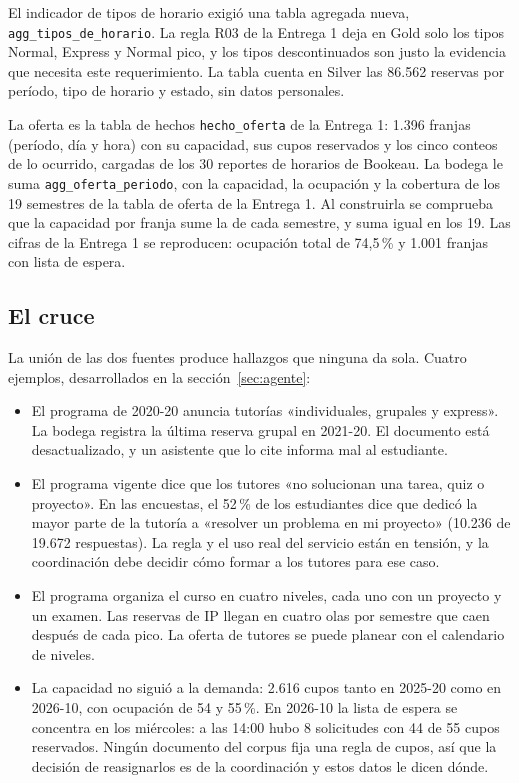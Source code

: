 \documentclass[11pt,letterpaper]{article}
\newcommand{\cod}[1]{\texttt{\small #1}}
\begin{document}
El indicador de tipos de horario exigió una tabla agregada nueva, \cod{agg\_tipos\_de\_horario}. La regla R03 de la Entrega 1 deja en Gold solo los tipos Normal, Express y Normal pico, y los tipos descontinuados son justo la evidencia que necesita este requerimiento. La tabla cuenta en Silver las 86.562 reservas por período, tipo de horario y estado, sin datos personales.

La oferta es la tabla de hechos \cod{hecho\_oferta} de la Entrega 1: 1.396 franjas (período, día y hora) con su capacidad, sus cupos reservados y los cinco conteos de lo ocurrido, cargadas de los 30 reportes de horarios de Bookeau. La bodega le suma \cod{agg\_oferta\_periodo}, con la capacidad, la ocupación y la cobertura de los 19 semestres de la tabla de oferta de la Entrega 1. Al construirla se comprueba que la capacidad por franja sume la de cada semestre, y suma igual en los 19. Las cifras de la Entrega 1 se reproducen: ocupación total de 74,5\,\% y 1.001 franjas con lista de espera.

\subsection{El cruce}

La unión de las dos fuentes produce hallazgos que ninguna da sola. Cuatro ejemplos, desarrollados en la sección~\ref{sec:agente}:

\begin{itemize}[leftmargin=1.5em,itemsep=2pt]
\item El programa de 2020-20 anuncia tutorías «individuales, grupales y express». La bodega registra la última reserva grupal en 2021-20. El documento está desactualizado, y un asistente que lo cite informa mal al estudiante.
\item El programa vigente dice que los tutores «no solucionan una tarea, quiz o proyecto». En las encuestas, el 52\,\% de los estudiantes dice que dedicó la mayor parte de la tutoría a «resolver un problema en mi proyecto» (10.236 de 19.672 respuestas). La regla y el uso real del servicio están en tensión, y la coordinación debe decidir cómo formar a los tutores para ese caso.
\item El programa organiza el curso en cuatro niveles, cada uno con un proyecto y un examen. Las reservas de IP llegan en cuatro olas por semestre que caen después de cada pico. La oferta de tutores se puede planear con el calendario de niveles.
\item La capacidad no siguió a la demanda: 2.616 cupos tanto en 2025-20 como en 2026-10, con ocupación de 54 y 55\,\%. En 2026-10 la lista de espera se concentra en los miércoles: a las 14:00 hubo 8 solicitudes con 44 de 55 cupos reservados. Ningún documento del corpus fija una regla de cupos, así que la decisión de reasignarlos es de la coordinación y estos datos le dicen dónde.
\end{itemize}
\end{document}
